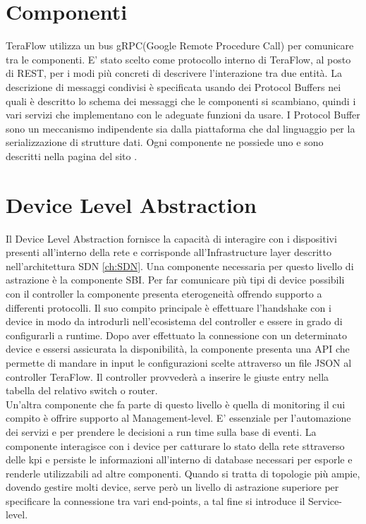 \section{Componenti}
TeraFlow utilizza un bus gRPC(Google Remote Procedure Call) per comunicare tra le componenti. 
E' stato scelto come protocollo interno di TeraFlow, al posto di REST, per i modi più concreti di descrivere l'interazione tra due entità.
La descrizione di messaggi condivisi è specificata usando dei Protocol Buffers nei quali è descritto lo schema dei messaggi che le componenti si scambiano, quindi i vari servizi che implementano con le adeguate funzioni da usare. 
I Protocol Buffer sono un meccanismo indipendente sia dalla piattaforma che dal linguaggio per la serializzazione di strutture dati. Ogni componente ne possiede uno e sono descritti nella pagina del sito \cite{ProtoBuf}.

\section{Device Level Abstraction}
Il Device Level Abstraction fornisce la capacità di interagire con i dispositivi presenti all'interno della rete e corrisponde all'Infrastructure layer descritto nell'architettura SDN \ref{ch:SDN}.
Una componente necessaria per questo livello di astrazione è la componente SBI.
Per far comunicare più tipi di device possibili con il controller la componente presenta eterogeneità offrendo supporto a differenti protocolli.
Il suo compito principale è effettuare l'handshake con i device in modo da introdurli nell'ecosistema del controller
e essere in grado di configurarli a runtime. 
Dopo aver effettuato la connessione con un determinato device e essersi assicurata la disponibilità,
la componente presenta una API che permette di mandare in input le configurazioni scelte attraverso un file JSON al controller TeraFlow. 
Il controller provvederà a inserire le giuste entry nella tabella del relativo switch o router.
\\Un'altra componente che fa parte di questo livello è quella di monitoring il cui compito è offrire supporto al Management-level.
E' essenziale per l'automazione dei servizi e per prendere le decisioni a run time sulla base di eventi.
La componente interagisce con i device per catturare lo stato della rete sttraverso delle kpi e persiste le informazioni all'interno di database necessari per esporle e renderle utilizzabili ad altre componenti.
Quando si tratta di topologie più ampie, dovendo gestire molti device, serve però un livello di astrazione superiore per specificare la connessione tra vari end-points, a tal fine si introduce il Service-level. 
